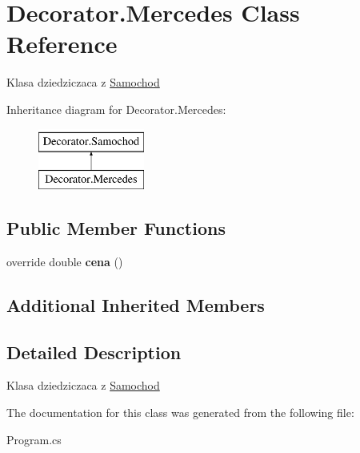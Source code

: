\hypertarget{class_decorator_1_1_mercedes}{}\section{Decorator.\+Mercedes Class Reference}
\label{class_decorator_1_1_mercedes}


Klasa dziedziczaca z \hyperlink{class_decorator_1_1_samochod}{Samochod}  


Inheritance diagram for Decorator.\+Mercedes\+:\begin{figure}[H]
\begin{center}
\leavevmode
\includegraphics[height=2.000000cm]{class_decorator_1_1_mercedes}
\end{center}
\end{figure}
\subsection*{Public Member Functions}
\begin{DoxyCompactItemize}
\item 
\mbox{\label{class_decorator_1_1_mercedes_a86a532d19bd7b691e504d1dee0aee529}} 
override double {\bfseries cena} ()
\end{DoxyCompactItemize}
\subsection*{Additional Inherited Members}


\subsection{Detailed Description}
Klasa dziedziczaca z \hyperlink{class_decorator_1_1_samochod}{Samochod} 



The documentation for this class was generated from the following file\+:\begin{DoxyCompactItemize}
\item 
Program.\+cs\end{DoxyCompactItemize}
